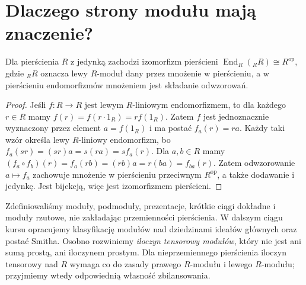 \section{Dlaczego strony modułu mają znaczenie?}
\begin{stwierdzenie}
\label{aa:st:modules-end-regular}
Dla pierścienia $R$ z jedynką zachodzi izomorfizm
pierścieni $\operatorname{End}_R({}_RR)\cong R^{\mathrm{op}}$,
gdzie ${}_RR$ oznacza lewy $R$-moduł dany przez
mnożenie w pierścieniu, a w pierścieniu endomorfizmów
mnożeniem jest składanie odwzorowań.
\end{stwierdzenie}
\begin{proof}
Jeśli $f:R\to R$ jest lewym $R$-liniowym endomorfizmem,
to dla każdego $r\in R$ mamy
$f(r)=f(r\cdot1_R)=rf(1_R)$. Zatem $f$
jest jednoznacznie wyznaczony przez element
$a=f(1_R)$ i ma postać $f_a(r)=ra$.
Każdy taki wzór określa lewy $R$-liniowy endomorfizm,
bo $f_a(sr)=(sr)a=s(ra)=sf_a(r)$.
Dla $a,b\in R$ mamy
$(f_a\circ f_b)(r)=f_a(rb)=(rb)a=r(ba)=f_{ba}(r)$.
Zatem odwzorowanie $a\mapsto f_a$ zachowuje
mnożenie w pierścieniu przeciwnym $R^{\mathrm{op}}$,
a także dodawanie i jedynkę. Jest bijekcją,
więc jest izomorfizmem pierścieni.
\end{proof}

\begin{uwaga}
\label{aa:uw:modules-future}
Zdefiniowaliśmy moduły, podmoduły, prezentacje,
krótkie ciągi dokładne i moduły rzutowe, nie zakładając
przemienności pierścienia. W dalszym ciągu kursu
opracujemy klasyfikację modułów nad dziedzinami
ideałów głównych oraz postać Smitha. Osobno
rozwiniemy \emph{iloczyn tensorowy modułów}, który
nie jest ani sumą prostą, ani iloczynem prostym.
Dla nieprzemiennego pierścienia iloczyn tensorowy
nad $R$ wymaga co do zasady prawego $R$-modułu
i lewego $R$-modułu; przyjmiemy wtedy odpowiednią
własność zbilansowania.
\end{uwaga}

\setlength{\parskip}{4pt}
